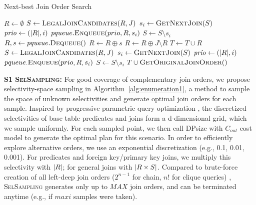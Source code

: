 \begin{algorithm}[!t] \small
\caption{Next-best Join Order Search}\label{alg:enumeration2}
\begin{algorithmic}[1]
\State $R \gets \emptyset$
\State $S \gets \textsc{LegalJoinCandidates}(R, J)$ 
    \State $s_i \gets \textsc{GetNextJoin}(S)$
    \State $\mathit{prio} \gets (\lvert R\rvert, i)$
    \State $pqueue.\textsc{Enqueue}(prio, R, s_i)$
    \State $S \gets S \setminus s_i$
\EndFor
{}
    \State $R, s \gets pqueue.\textsc{Dequeue}()$ 
    \State $R \gets R \oplus s$
        \State $R \gets R \oplus J \setminus R$ 
        \State $T \gets T \cup R$
    \Else
        \State $S \gets \textsc{LegalJoinCandidates}(R, J)$
            \State $s_i \gets \textsc{GetNextJoin}(S)$
            \State $\mathit{prio} \gets (\lvert R\rvert, i)$
            \State $pqueue.\textsc{Enqueue}(prio, R, s_i)$
            \State $S \gets S \setminus s_i$
        \EndFor
    \EndIf
\EndWhile
\State \Return $T \cup \textsc{GetOriginalJoinOrder}()$
\end{algorithmic}
\end{algorithm}

\textbf{S1 \textsc{SelSampling}:} For good coverage of complementary join orders, we propose selectivity-space sampling in Algorithm~\ref{alg:enumeration1}, a method to sample the space of unknown selectivities and generate optimal join orders for each sample. Inspired by progressive parametric query optimization \cite{BizarroBD09}, the discretized selectivities of base table predicates and joins form a d-dimensional grid, which we sample uniformly. For each sampled point, we then call DPsize with $C_{out}$ cost model to generate the optimal plan for this scenario. In order to efficiently explore alternative orders, we use an exponential discretization (e.g., 0.1, 0.01, 0.001). For predicates and foreign key/primary key joins, we multiply this selectivity with $\lvert R\rvert$; for general joins with $\lvert R \times S\rvert$. Compared to brute-force creation of all left-deep join orders ($2^{n-1}$ for chain, $n!$ for clique queries) \cite{moerkotte23}, \textsc{SelSampling} generates only up to $\mathit{MAX}$ join orders, and can be terminated anytime (e.g., if $\mathit{maxi}$ samples were taken).

